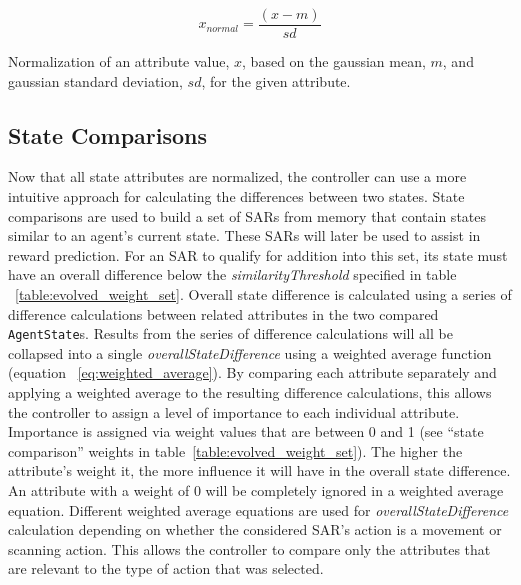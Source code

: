 \begin{capeq}
  \begin{equation} \label{eq:gaussian_normalize}
    x_{normal} = \frac{(x - m)}{sd}
  \end{equation}
  \caption[Value Normalization]{Normalization of an attribute value, $x$, based on the gaussian mean, $m$, and gaussian standard deviation, $sd$, for the given attribute.}
\end{capeq}



\subsection{State Comparisons} \label{subsec:state_comparisons}
Now that all state attributes are normalized, the controller can use a more intuitive approach for calculating the differences between two states.
State comparisons are used to build a set of SARs from memory that contain states similar to an agent's current state.
These SARs will later be used to assist in reward prediction.
For an SAR to qualify for addition into this set, its state must have an overall difference below the \textit{similarityThreshold} specified in table ~\ref{table:evolved_weight_set}.
Overall state difference is calculated using a series of difference calculations between related attributes in the two compared \texttt{AgentState}s.
Results from the series of difference calculations will all be collapsed into a single \textit{overallStateDifference} using a weighted average function (equation ~\ref{eq:weighted_average}).
By comparing each attribute separately and applying a weighted average to the resulting difference calculations, this allows the controller to assign a level of importance to each individual attribute.
Importance is assigned via weight values that are between 0 and 1 (see ``state comparison'' weights in table~\ref{table:evolved_weight_set}).
The higher the attribute's weight it, the more influence it will have in the overall state difference.
An attribute with a weight of 0 will be completely ignored in a weighted average equation.
Different weighted average equations are used for \textit{overallStateDifference} calculation depending on whether the considered SAR's action is a movement or scanning action.
This allows the controller to compare only the attributes that are relevant to the type of action that was selected.

